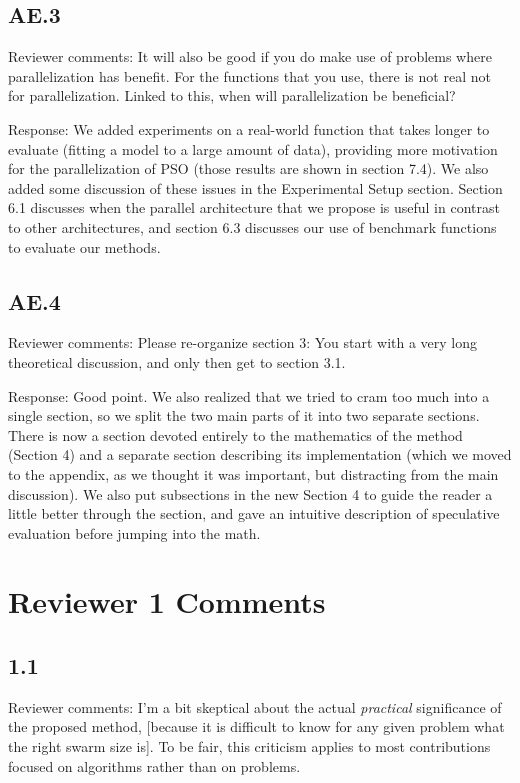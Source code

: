 \documentclass[onecolumn, 12pt]{article}
\begin{document}
\subsection*{AE.3}

Reviewer comments: It will also be good if you do make use of problems where
parallelization has benefit. For the functions that you use, there is not real
not for parallelization. Linked to this, when will parallelization be
beneficial?

Response: We added experiments on a real-world function that takes longer to
evaluate (fitting a model to a large amount of data), providing more motivation
for the parallelization of PSO (those results are shown in section 7.4).  We
also added some discussion of these issues in the Experimental Setup section.
Section 6.1 discusses when the parallel architecture that we propose is useful
in contrast to other architectures, and section 6.3 discusses our use of
benchmark functions to evaluate our methods.


\subsection*{AE.4}

Reviewer comments: Please re-organize section 3: You start with a very long
theoretical discussion, and only then get to section 3.1.

Response: Good point.  We also realized that we tried to cram too much into a
single section, so we split the two main parts of it into two separate
sections.  There is now a section devoted entirely to the mathematics of the
method (Section 4) and a separate section describing its implementation
(which we moved to the appendix, as we thought it was important, but
distracting from the main discussion).  We also put subsections in the new
Section 4 to guide the reader a little better through the section, and gave an
intuitive description of speculative evaluation before jumping into the math.

\section*{Reviewer 1 Comments}

\subsection*{1.1}

Reviewer comments: I'm a bit skeptical about the actual \emph{practical}
significance of the proposed method, [because it is difficult to know for any
given problem what the right swarm size is]. To be fair, this criticism applies
to most contributions focused on algorithms rather than on problems.
\end{document}
